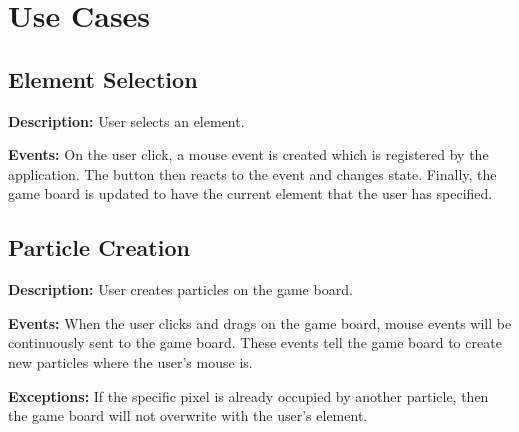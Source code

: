 \documentclass[12pt]{article}
\begin{document}
    \section{Use Cases}

    \subsection{Element Selection}

    \textbf{Description:} User selects an element.

    \textbf{Events:} On the user click, a mouse event is created which is
    registered by the application. The button then reacts to the event and
    changes state. Finally, the game board is updated to have the current
    element that the user has specified.

    \subsection{Particle Creation}

    \textbf{Description:} User creates particles on the game board.

    \textbf{Events:} When the user clicks and drags on the game board, mouse
    events will be continuously sent to the game board. These events tell the
    game board to create new particles where the user's mouse is.

    \textbf{Exceptions:} If the specific pixel is already occupied by another
    particle, then the game board will not overwrite with the user's element.
    
\end{document}
